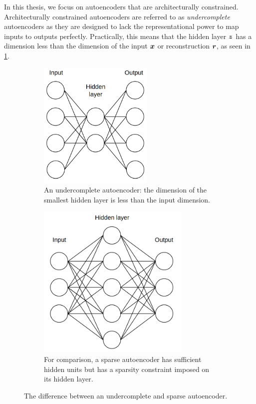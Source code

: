 In this thesis, we focus on autoencoders that are architecturally constrained.
Architecturally constrained autoencoders are referred to as \textit{undercomplete} autoencoders as they are designed to lack the representational power to map inputs to outputs perfectly. Practically, this means that the hidden layer $\boldsymbol{z}$ has a dimension less than the dimension of the input $\boldsymbol{x}$ or reconstruction $\boldsymbol{r}$, as seen in \cref{fig:2_undercomplete_autoencoder}.
\begin{figure}[hbt]
    \begin{subfigure}[b]{0.45\textwidth}
        \centering
        \includegraphics[width=0.6\textwidth]{figures/2_/2_undercomplete_autoencoder.png}
        \caption{An undercomplete autoencoder: the dimension of the smallest hidden layer is less than the input dimension.}
        \label{fig:2_undercomplete_autoencoder}
    \end{subfigure}
    \hfill
    \begin{subfigure}[b]{0.45\textwidth}
        \centering
        \includegraphics[width=0.8\textwidth]{figures/2_/2_overcomplete_autoencoder.png}
        \caption{For comparison, a sparse autoencoder has sufficient hidden units but has a sparsity constraint imposed on its hidden layer.}
        \label{fig:2_overcomplete_autoencoder}
    \end{subfigure}
    \caption{The difference between an undercomplete and sparse autoencoder.}
    \label{fig:2_autoencoders}
\end{figure}

